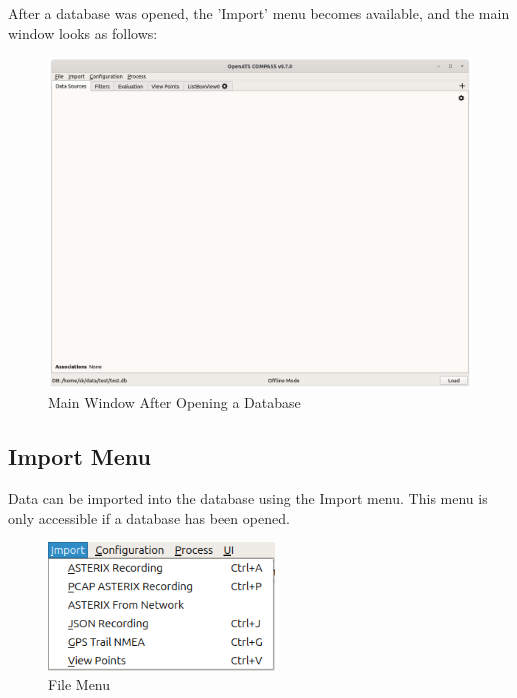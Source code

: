 After a database was opened, the 'Import' menu becomes available, and the main window looks as follows:

\begin{figure}[H]
  \hspace*{-2.5cm}
    \includegraphics[width=19cm]{figures/main_window_opened.png}
  \caption{Main Window After Opening a Database}
\end{figure}

\subsection{Import Menu}
\label{sec:ui_overview_import_menu}

Data can be imported into the database using the Import menu. This menu is only accessible if a database has been opened.

\begin{figure}[H]
  \center
    \includegraphics[width=6cm,frame]{figures/ui_import_menu.png}
  \caption{File Menu}
\end{figure}

